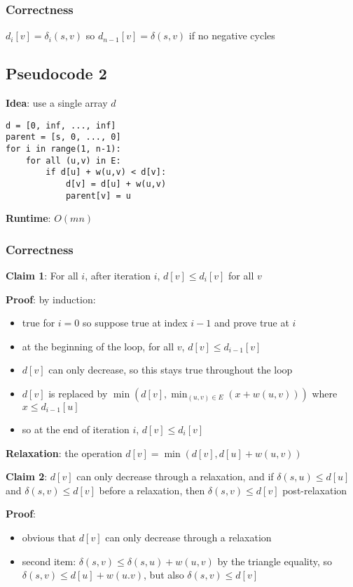 \documentclass[11pt]{article}
\begin{document}
\subsubsection{Correctness}
\label{sec:orgac50b84}
\(d_{i}[v] = \delta_{i}(s,v)\) so \(d_{n-1}[v] = \delta(s,v)\) if no negative cycles
\subsection{Pseudocode 2}
\label{sec:org412cbe2}
\textbf{Idea}: use a single array \(d\)

\begin{verbatim}
d = [0, inf, ..., inf]
parent = [s, 0, ..., 0]
for i in range(1, n-1):
    for all (u,v) in E:
        if d[u] + w(u,v) < d[v]:
            d[v] = d[u] + w(u,v)
            parent[v] = u
\end{verbatim}

\textbf{Runtime}: \(O(mn)\)
\subsubsection{Correctness}
\label{sec:orgc0416d4}
\textbf{Claim 1}: For all \(i\), after iteration \(i\), \(d[v] \le d_{i}[v]\) for all \(v\)

\textbf{Proof}: by induction:
\begin{itemize}
\item true for \(i=0\) so suppose true at index \(i-1\) and prove true at \(i\)
\item at the beginning of the loop, for all \(v\), \(d[v] \le d_{i-1}[v]\)
\item \(d[v]\) can only decrease, so this stays true throughout the loop
\item \(d[v]\) is replaced by \(\min(d[v], \min_{(u,v) \in E}(x + w(u,v)))\) where
\(x \le d_{i-1}[u]\)
\item so at the end of iteration \(i\), \(d[v] \le d_{i}[v]\)
\end{itemize}

\textbf{Relaxation}: the operation \(d[v] = \min(d[v], d[u] + w(u,v))\)

\textbf{Claim 2}: \(d[v]\) can only decrease through a relaxation, and if \(\delta(s,u) \le d[u]\)
and \(\delta(s,v) \le d[v]\) before a relaxation, then \(\delta(s,v) \le d[v]\) post-relaxation

\textbf{Proof}:
\begin{itemize}
\item obvious that \(d[v]\) can only decrease through a relaxation
\item second item: \(\delta(s,v) \le \delta(s,u) + w(u,v)\) by the triangle equality, so
\(\delta(s,v) \le d[u] + w(u.v)\), but also \(\delta(s,v) \le d[v]\)
\end{itemize}
\end{document}
